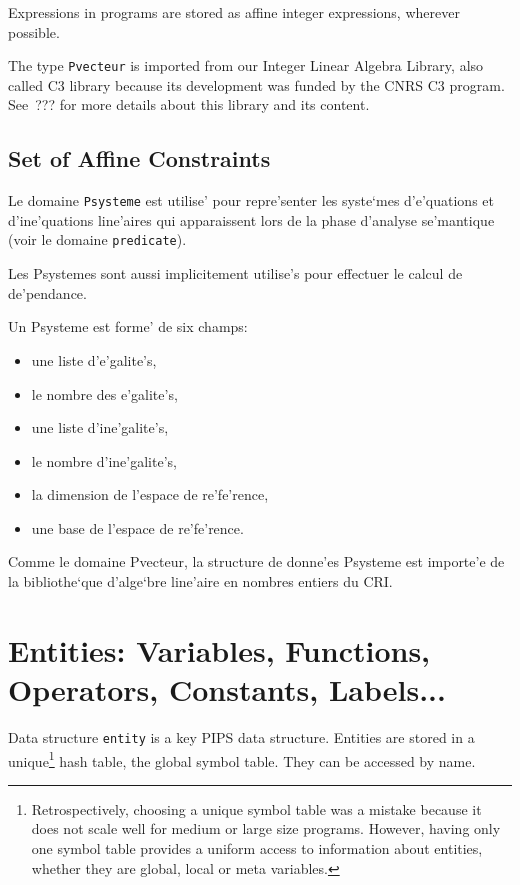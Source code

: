 Expressions in programs are stored as affine integer expressions,
wherever possible.

\iffalse
Les expressions apparaissant dans le programme analyse' sont mises
sous cette forme quand c'est possible.
\fi

The type {\tt Pvecteur} is imported from our Integer Linear Algebra
Library, also called C3 library because its development was funded by
the CNRS C3 program. See~??? for more details about this library and its
content.

\iffalse
La structure de donne'es Pvecteur est importe'e de la bibliothe`que d'alge`bre
line'aire en nombres entiers du CRI.
\fi

\subsection{Set of Affine Constraints}
\label{subsection-psysteme}

{}

Le domaine {\tt Psysteme} est utilise' pour repre'senter les syste`mes
d'e'quations et d'ine'quations line'aires qui apparaissent lors
de la phase d'analyse se'mantique (voir le domaine {\tt predicate}).

Les Psystemes sont aussi implicitement utilise's pour effectuer le
calcul de de'pendance.

Un Psysteme est forme' de six champs:
\begin{itemize}
  \item une liste d'e'galite's,
  \item le nombre des e'galite's,
  \item une liste d'ine'galite's,
  \item le nombre d'ine'galite's,
  \item la dimension de l'espace de re'fe'rence,
  \item une base de l'espace de re'fe'rence.
\end{itemize}

Comme le domaine Pvecteur, la structure de donne'es Psysteme est
importe'e de la bibliothe`que d'alge`bre line'aire en nombres entiers du
CRI.

\section{Entities: Variables, Functions, Operators, Constants, Labels...}
\label{entity}

Data structure \verb/entity/ is a key PIPS data structure. Entities are
stored in a unique\footnote{Retrospectively, choosing a unique symbol
table was a mistake because it does not scale well for medium or large
size programs. However, having only one symbol table provides a uniform
access to information about entities, whether they are global, local or
meta variables.} hash table, the global symbol table. They can be
accessed by name.

